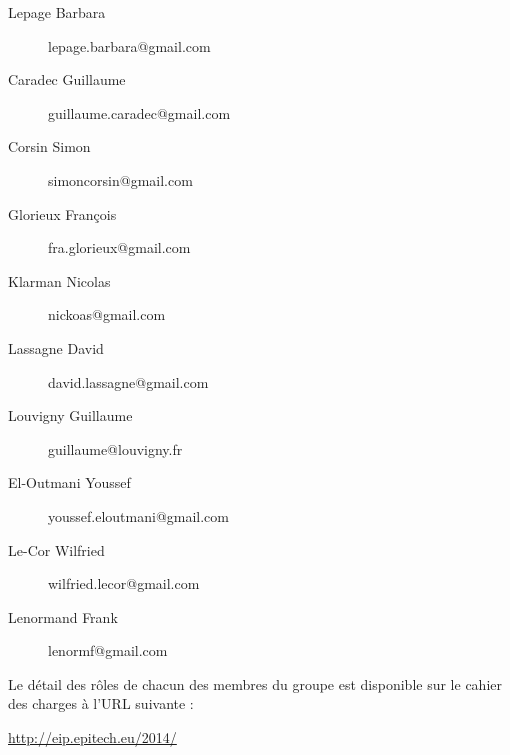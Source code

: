 \documentclass{life-fr}
\begin{document}
\begin{description}
  \item[Lepage Barbara] lepage.barbara@gmail.com
  \item[Caradec Guillaume] guillaume.caradec@gmail.com
  \item[Corsin Simon] simoncorsin@gmail.com
  \item[Glorieux François] fra.glorieux@gmail.com
  \item[Klarman Nicolas] nickoas@gmail.com
  \item[Lassagne David] david.lassagne@gmail.com
  \item[Louvigny Guillaume] guillaume@louvigny.fr
  \item[El-Outmani Youssef] youssef.eloutmani@gmail.com
  \item[Le-Cor Wilfried] wilfried.lecor@gmail.com
  \item[Lenormand Frank] lenormf@gmail.com
\end{description}

Le détail des rôles de chacun des membres du groupe est disponible sur
le cahier des charges à l'URL suivante :\\
\begin{center}
  \url{http://eip.epitech.eu/2014/}
\end{center}

\end{document}
